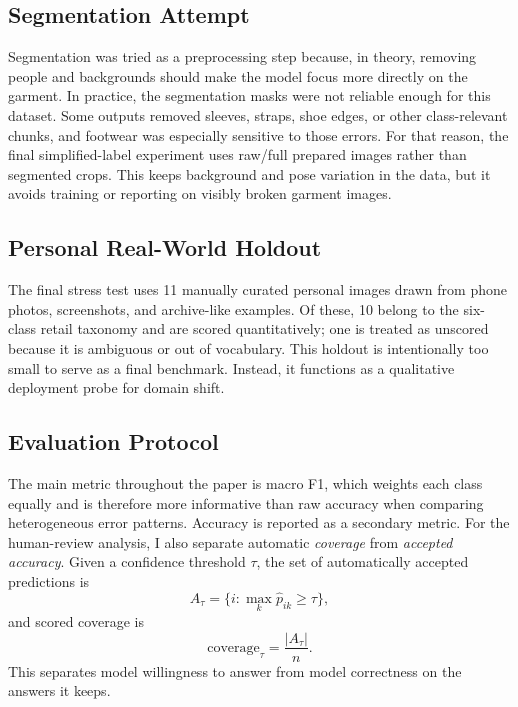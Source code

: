 \documentclass[11pt]{article}
\begin{document}
\subsection{Segmentation Attempt}

Segmentation was tried as a preprocessing step because, in theory, removing people and backgrounds should make the model focus more directly on the garment. In practice, the segmentation masks were not reliable enough for this dataset. Some outputs removed sleeves, straps, shoe edges, or other class-relevant chunks, and footwear was especially sensitive to those errors. For that reason, the final simplified-label experiment uses raw/full prepared images rather than segmented crops. This keeps background and pose variation in the data, but it avoids training or reporting on visibly broken garment images.

\subsection{Personal Real-World Holdout}

The final stress test uses 11 manually curated personal images drawn from phone photos, screenshots, and archive-like examples. Of these, 10 belong to the six-class retail taxonomy and are scored quantitatively; one is treated as unscored because it is ambiguous or out of vocabulary. This holdout is intentionally too small to serve as a final benchmark. Instead, it functions as a qualitative deployment probe for domain shift.

\subsection{Evaluation Protocol}

The main metric throughout the paper is macro F1, which weights each class equally and is therefore more informative than raw accuracy when comparing heterogeneous error patterns. Accuracy is reported as a secondary metric. For the human-review analysis, I also separate automatic \emph{coverage} from \emph{accepted accuracy}. Given a confidence threshold $\tau$, the set of automatically accepted predictions is
\begin{equation}
A_\tau = \{i : \max_k \hat{p}_{ik} \ge \tau\},
\end{equation}
and scored coverage is
\begin{equation}
\mathrm{coverage}_\tau = \frac{|A_\tau|}{n}.
\end{equation}
This separates model willingness to answer from model correctness on the answers it keeps.
\end{document}
